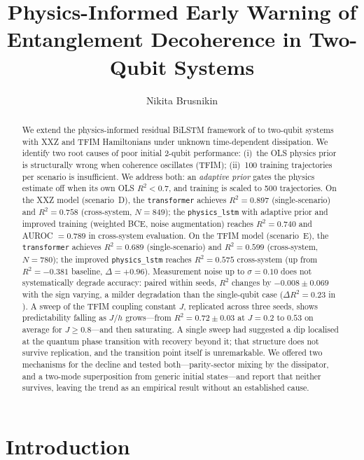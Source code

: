\documentclass[twocolumn,10pt]{article}
\title{\textbf{Physics-Informed Early Warning of Entanglement Decoherence
in Two-Qubit Systems}}
\author[1]{Nikita Brusnikin}
\affil[1]{Independent Researcher~\needspaste{confirm this affiliation or replace it}}
\date{}
\begin{document}
\maketitle

\begin{abstract}
We extend the physics-informed residual BiLSTM framework of
\cite{Paper1Brusnikin} to two-qubit systems with XXZ and TFIM
Hamiltonians under unknown time-dependent dissipation.
We identify two root causes of poor initial 2-qubit performance:
(i)~the OLS physics prior is structurally wrong when coherence
oscillates (TFIM); (ii)~100 training trajectories per scenario is
insufficient.
We address both: an \emph{adaptive prior} gates the physics estimate
off when its own OLS $R^2 < 0.7$, and training is scaled to 500
trajectories.
On the XXZ model (scenario~D), the \texttt{transformer} achieves
$R^2 = 0.897$ (single-scenario) and $R^2 = 0.758$ (cross-system,
$N = 849$); the \texttt{physics\_lstm} with adaptive prior and improved
training (weighted BCE, noise augmentation) reaches $R^2 = 0.740$ and
AUROC $= 0.789$ in cross-system evaluation.
On the TFIM model (scenario~E), the \texttt{transformer} achieves
$R^2 = 0.689$ (single-scenario) and $R^2 = 0.599$ (cross-system, $N =
780$); the improved \texttt{physics\_lstm} reaches $R^2 = 0.575$
cross-system (up from $R^2 = -0.381$ baseline, $\Delta = +0.96$).
Measurement noise up to $\sigma = 0.10$ does not systematically degrade
accuracy: paired within seeds, $R^2$ changes by $-0.008 \pm 0.069$ with
the sign varying, a milder degradation than the single-qubit case
($\Delta R^2 = 0.23$ in \cite{Paper1Brusnikin}).
A sweep of the TFIM coupling constant $J$, replicated across three
seeds, shows predictability falling as $J/h$ grows---from
$R^2 = 0.72 \pm 0.03$ at $J = 0.2$ to $0.53$ on average for
$J \geq 0.8$---and then saturating.
A single sweep had suggested a dip localised at the quantum phase
transition with recovery beyond it; that structure does not survive
replication, and the transition point itself is unremarkable.
We offered two mechanisms for the decline and tested both---parity-sector
mixing by the dissipator, and a two-mode superposition from generic
initial states---and report that neither survives, leaving the trend as
an empirical result without an established cause.
\end{abstract}

\section{Introduction}
\end{document}
